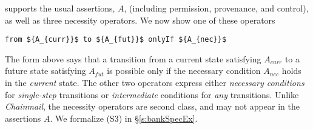 \Nec supports the usual assertions, $A$, (including permission, provenance,
and control), as well as three necessity 
{operators. We now show one of these operators} 
\begin{lstlisting}[mathescape=true, language=chainmail, frame=lines]
                                from ${A_{curr}}$ to ${A_{fut}}$ onlyIf ${A_{nec}}$ 
\end{lstlisting}
The  form   {above} says that %
a  {transition} from a current state satisfying $A_{curr}$ to a future
state satisfying $A_{fut}$ %
is possible only if the necessary condition
$A_{nec}$ holds in the \emph{current} state.
 {The other two operators express either \emph{necessary conditions} for
\emph{single-step} transitions %
or \emph{intermediate} conditions for \emph{any} transitions.
}
Unlike  \emph{Chainmail}, 
 the necessity operators %
 are second class, and may not appear in the assertions $A$.
We formalize (S3) %
in  \S\ref{s:bankSpecEx}.


 
